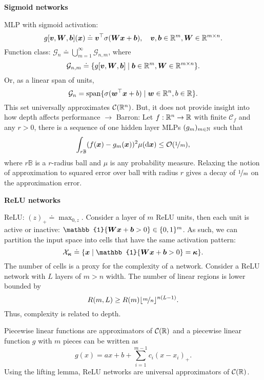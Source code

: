 \documentclass[10pt]{article}
\newenvironment{topic}[1]
{\textbf{\sffamily \colorbox{black}{\rlap{\textbf{\textcolor{white}{#1}}}\hspace{\linewidth}\hspace{-2\fboxsep}}}}
{}
\newenvironment{subtopic}[1]
{\begin{center}\textbf{\sffamily #1}\end{center}}
{}
\begin{document}
\begin{multicols*}{3}
\begin{topic}{Feedforward networks}
        \begin{subtopic}{Sigmoid networks}
            MLP with sigmoid activation: \[
                g[\bm{v}, \bm{W}, \bm{b}](\bm{x}) \doteq \bm{v}^\top \sigma(\bm{W}\bm{x}+\bm{b}), \quad \bm{v},\bm{b}\in\mathbb{R}^m, \bm{W}\in\mathbb{R}^{m\times n}.
            \]
            Function class: $\mathcal{G}_n \doteq \bigcup_{m=1}^{\infty} \mathcal{G}_{n,m}$, where \[
                \mathcal{G}_{n,m} \doteq \{ g[\bm{v},\bm{W},\bm{b}] \mid \bm{b}\in\mathbb{R}^m, \bm{W}\in\mathbb{R}^{m\times n} \}.
            \]
            Or, as a linear span of units, \[
                \mathcal{G}_{n} = \mathrm{span} \{ \sigma(\bm{w}^\top\bm{x} + b) \mid \bm{w} \in \mathbb{R}^n, b \in \mathbb{R} \}.
            \]
            This set universally approximates $\mathcal{C}(\mathbb{R}^n)$. But, it does not provide insight into how
            depth affects performance $\to$ Barron: Let $f: \mathbb{R}^n \to \mathbb{R}$ with finite $\mathcal{C}_f$ and any $r
                > 0$, there is a sequence of one hidden layer MLPs $(g_m)_{m \in \mathbb{N}}$ such that \[
                \int_{r \mathbb{B}} (f(\vec{x}) - g_m(\vec{x}))^2 \mu(\mathrm{d}\vec{x}) \leq \bigo{\nicefrac{1}{m}},
            \]
            where $r\mathbb{B}$ is a $r$-radius ball and $\mu$ is any probability measure. Relaxing the notion
            of approximation to squared error over ball with radius $r$ gives a decay of $\nicefrac{1}{m}$ on
            the approximation error.
        \end{subtopic}

        \begin{subtopic}{ReLU networks}
            ReLU: $(z)_+ \doteq \max_{0,z}$. Consider a layer of $m$ ReLU units, then each unit is
            active or inactive: $\mathbb{1}\{ \mat{W}\vec{x} + \vec{b} > 0 \} \in \{ 0,1 \}^m$. As
            such, we can partition the input space into cells that have the same activation pattern: \[
                \mathcal{X}_{\vec{\kappa}} \doteq \{ \vec{x} \mid \mathbb{1}\{ \mat{W}\vec{x} + \vec{b} > 0 \} = \vec{\kappa} \}.
            \]
            The number of cells is a proxy for the complexity of a network. Consider a ReLU network with $L$
            layers of $m > n$ width. The number of linear regions is lower bounded by \[
                R(m,L) \geq R(m) \lfloor \nicefrac{m}{n} \rfloor^{n(L-1)}.
            \]
            Thus, complexity is related to depth.

            Piecewise linear functions are approximators of $\mathcal{C}(\mathbb{R})$ and a piecewise linear function
            $g$ with $m$ pieces can be written as \[
                g(x) = ax + b + \sum_{i=1}^{m-1} c_i(x - x_i)_+.
            \]
            Using the lifting lemma, ReLU networks are universal approximators of $\mathcal{C}(\mathbb{R})$.
        \end{subtopic}


\end{topic}
\end{multicols*}
\end{document}
